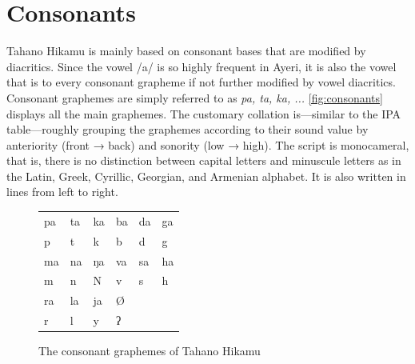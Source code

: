 \section{Consonants}

Tahano Hikamu is mainly based on consonant 
bases that are modified by diacritics. Since the vowel /a/ is so highly frequent 
in Ayeri, it is also the vowel that is  to every consonant grapheme 
if not further modified by vowel diacritics. Consonant graphemes are simply 
referred to as \textit{pa, ta, ka, ...} \autoref{fig:consonants} displays all 
the main graphemes. The customary collation is---similar to the IPA 
table---roughly grouping the graphemes according to their sound value by 
anteriority (front → back) and sonority (low → high). The script is monocameral, 
that is, there is no distinction between capital letters and minuscule letters 
as in the Latin, Greek, Cyrillic, Georgian, and Armenian alphabet. It is also 
written in lines from left to right.


\begin{figure}[ht]
\caption{The consonant graphemes of Tahano Hikamu}

\begin{tabu} to \linewidth{X[c] X[c] X[c] X[c] X[c] X[c]}
\toprule
\tableheaderfont	pa & ta & ka & ba & da & ga \\
\rowfont{\Tagati\huge}	p & t & k & b & d & g \\

\midrule

\tableheaderfont	ma & na & ŋa & va & sa & ha \\
\rowfont{\Tagati\huge}	m & n & N & v & s & h \\

\midrule

\tableheaderfont	ra & la & ja & Ø \\
\rowfont{\Tagati\huge}	r & l & y & ʔ \\

\bottomrule
\end{tabu}
\label{fig:thcons}
\end{figure}

